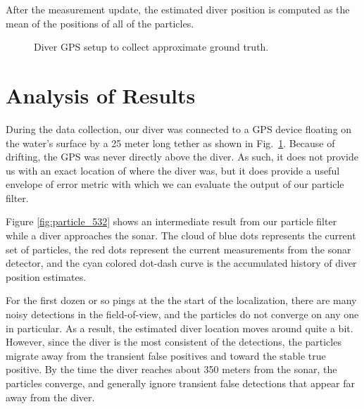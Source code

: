 \documentclass{article} %
\begin{document}
After the measurement update, the estimated diver position is computed as the mean of the positions of all of the particles.

\begin{figure}[htpb]
  \centering
  \caption{Diver GPS setup to collect approximate ground truth.}
  \label{fig:diver_gps_setup}
\end{figure}

\section{Analysis of Results}
During the data collection, our diver was connected to a GPS device floating on the water's surface by a 25 meter long tether as shown in Fig.~\ref{fig:diver_gps_setup}. Because of drifting, the GPS was never directly above the diver. As such, it does not provide us with an exact location of where the diver was, but it does provide a useful envelope of error metric with which we can evaluate the output of our particle filter.

Figure \ref{fig:particle_532} shows an intermediate result from our particle filter while a diver approaches the sonar. The cloud of blue dots represents the current set of particles, the red dots represent the current measurements from the sonar detector, and the cyan colored dot-dash curve is the accumulated history of diver position estimates.

For the first dozen or so pings at the the start of the localization, there are many noisy detections in the field-of-view, and the particles do not converge on any one in particular. As a result, the estimated diver location moves around quite a bit. However, since the diver is the most consistent of the detections, the particles migrate away from the transient false positives and toward the stable true positive. By the time the diver reaches about 350 meters from the sonar, the particles converge, and generally ignore transient false detections that appear far away from the diver.
\end{document}
